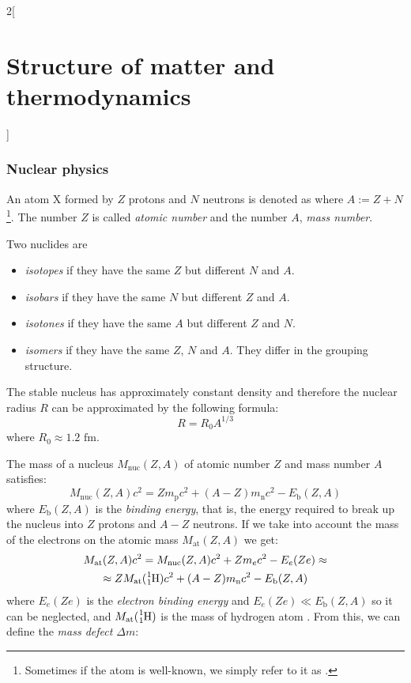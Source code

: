 \documentclass[../../../main.tex]{subfiles}
\begin{document}
\begin{multicols}{2}[\section{Structure of matter and thermodynamics}]
    \subsubsection{Nuclear physics}
    \begin{definition}[Atom]
        An atom X formed by $Z$ protons and $N$ neutrons is denoted as  where $A:=Z+N$\footnote{Sometimes if the atom  is well-known, we simply refer to it as .}. The number $Z$ is called \textit{atomic number} and the number $A$, \textit{mass number}.
    \end{definition}
    \begin{definition}
        Two nuclides are
        \begin{itemize}
            \item \textit{isotopes} if they have the same $Z$ but different $N$ and $A$.
            \item \textit{isobars} if they have the same $N$ but different $Z$ and $A$.
            \item \textit{isotones} if they have the same $A$ but different $Z$ and $N$.
            \item \textit{isomers} if they have the same $Z$, $N$ and $A$. They differ in the grouping structure.
        \end{itemize}
    \end{definition}
    \begin{prop}
        The stable nucleus has approximately constant density and therefore the nuclear radius $R$ can be approximated by the following formula:
        $$R=R_0A^{1/3}$$ where $R_0\approx1.2\text{ fm}$.
    \end{prop}
    \begin{prop}
        The mass of a nucleus $M_\text{nuc}(Z,A)$ of atomic number $Z$ and mass number $A$ satisfies:
        $$M_\text{nuc}(Z,A)c^2=Zm_\text{p}c^2+(A-Z)m_\text{n}c^2-E_\text{b}(Z,A)$$ where $E_\text{b}(Z,A)$ is the \textit{binding energy}, that is, the energy required to break up the nucleus into $Z$ protons and $A-Z$ neutrons. If we take into account the mass of the electrons on the atomic mass $M_\text{at}(Z,A)$ we get:
        \begin{multline*}
            M_\text{at}(Z,A)c^2=M_\text{nuc}(Z,A)c^2+Zm_ec^2-E_e(Ze)\approx\\\approx ZM_\text{at}(\ce{^1_1H})c^2+(A-Z)m_\text{n}c^2-E_\text{b}(Z,A)
        \end{multline*}
        where $E_e(Ze)$ is the \textit{electron binding energy} and $E_e(Ze)\ll E_\text{b}(Z,A)$ so it can be neglected, and $M_\text{at}(\ce{^1_1H})$ is the mass of hydrogen atom . From this, we can define the \textit{mass defect $\Delta m$}:

\end{prop}
\end{multicols}
\end{document}
